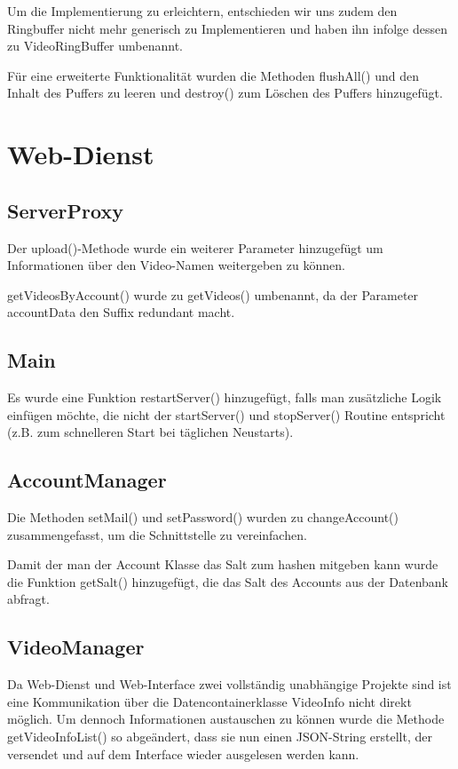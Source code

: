 Um die Implementierung zu erleichtern, entschieden wir uns zudem den Ringbuffer nicht mehr generisch zu Implementieren und haben ihn infolge dessen zu VideoRingBuffer umbenannt.  \par  

Für eine erweiterte Funktionalität wurden die Methoden flushAll() und den Inhalt des Puffers zu leeren und destroy() zum Löschen des Puffers hinzugefügt.

\section{Web-Dienst}

\subsection{ServerProxy}
Der upload()-Methode wurde ein weiterer Parameter hinzugefügt um Informationen über den Video-Namen weitergeben zu können.  \par  

getVideosByAccount() wurde zu getVideos() umbenannt, da der Parameter accountData den Suffix redundant macht.

\subsection{Main}
Es wurde eine Funktion restartServer() hinzugefügt, falls man zusätzliche Logik einfügen möchte, die nicht der startServer() und stopServer() Routine entspricht (z.B. zum schnelleren Start bei täglichen Neustarts).

\subsection{AccountManager}
Die Methoden setMail() und setPassword() wurden zu changeAccount() zusammengefasst, um die Schnittstelle zu vereinfachen.  \par  

Damit der man der Account Klasse das Salt zum hashen mitgeben kann wurde die Funktion getSalt() hinzugefügt, die das Salt des Accounts aus der Datenbank abfragt.

\subsection{VideoManager} \label{sec:VideoManager}
Da Web-Dienst und Web-Interface zwei vollständig unabhängige Projekte sind ist eine Kommunikation über die Datencontainerklasse VideoInfo nicht direkt möglich. Um dennoch Informationen austauschen zu können wurde die Methode getVideoInfoList() so abgeändert, dass sie nun einen JSON-String erstellt, der versendet und auf dem Interface wieder ausgelesen werden kann.

